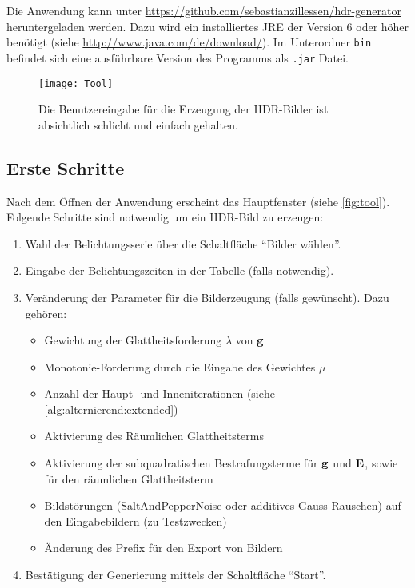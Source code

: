 Die Anwendung kann unter \url{https://github.com/sebastianzillessen/hdr-generator} heruntergeladen werden. Dazu wird ein installiertes \gls{JRE} der Version 6 oder höher benötigt (siehe \url{http://www.java.com/de/download/}). Im Unterordner \texttt{bin} befindet sich eine ausführbare Version des Programms als \texttt{.jar} Datei. 

\begin{figure}
  \begin{center}
    \texttt{[image: Tool]}
    \caption{Die Benutzereingabe für die Erzeugung der HDR-Bilder ist absichtlich schlicht und einfach gehalten.}
    \label{fig:tool}
  \end{center}
\end{figure}


\subsection{Erste Schritte}
Nach dem Öffnen der Anwendung erscheint das Hauptfenster (siehe \autoref{fig:tool}). Folgende Schritte sind notwendig um ein \gls{HDR}-Bild zu erzeugen:

\begin{enumerate}
    \item Wahl der Belichtungsserie über die Schaltfläche \enquote{Bilder wählen}.
    \item Eingabe der Belichtungszeiten in der Tabelle (falls notwendig).
    \item Veränderung der Parameter für die Bilderzeugung (falls gewünscht). Dazu gehören:
    \begin{itemize}
        \item Gewichtung der Glattheitsforderung $\lambda$ von $\mathbf g$
        \item Monotonie-Forderung durch die Eingabe des Gewichtes $\mu$
        \item Anzahl der Haupt- und Inneniterationen (siehe \autoref{alg:alternierend:extended})
        \item Aktivierung des Räumlichen Glattheitsterms 
        \item Aktivierung der subquadratischen Bestrafungsterme für $\mathbf g$ und $\mathbf E$, sowie für den räumlichen Glattheitsterm
        \item Bildstörungen (\gls{SaltAndPepperNoise} oder additives Gauss-Rauschen) auf den Eingabebildern (zu Testzwecken)
        \item Änderung des Prefix für den Export von Bildern
    \end{itemize}

    \item Bestätigung der Generierung mittels der Schaltfläche \enquote{Start}.
\end{enumerate}

